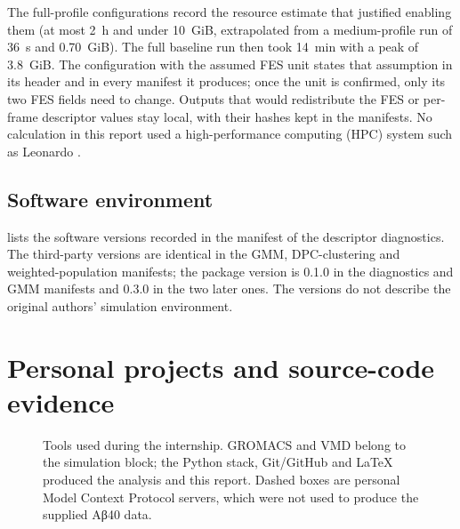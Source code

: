 The full-profile configurations record the resource estimate that justified enabling them (at most 2~h and under 10~GiB, extrapolated from a medium-profile run of 36~s and 0.70~GiB). The full baseline run then took 14~min with a peak of 3.8~GiB. The configuration with the assumed FES unit states that assumption in its header and in every manifest it produces; once the unit is confirmed, only its two FES fields need to change. Outputs that would redistribute the FES or per-frame descriptor values stay local, with their hashes kept in the manifests. No calculation in this report used a high-performance computing (HPC) system such as Leonardo \autocite{leonardodocs}.

\section*{Software environment}
 lists the software versions recorded in the manifest of the descriptor diagnostics. The third-party versions are identical in the GMM, DPC-clustering and weighted-population manifests; the package version is 0.1.0 in the diagnostics and GMM manifests and 0.3.0 in the two later ones. The versions do not describe the original authors' simulation environment.
\par\medskip\noindent\begin{minipage}{\textwidth}\centering
{}
\label{tab:environment}

\end{minipage}\par

\chapter{Personal projects and source-code evidence}\label{app:companion}
\begin{figure}[htbp]
\centering
\caption{Tools used during the internship. GROMACS and VMD belong to the simulation block; the Python stack, Git/GitHub and LaTeX produced the analysis and this report. Dashed boxes are personal Model Context Protocol servers, which were not used to produce the supplied Aβ40 data.}
\label{fig:tooling}
\end{figure}

